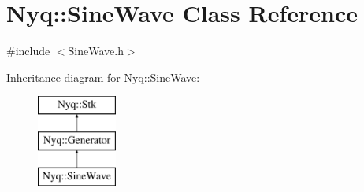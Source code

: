 \hypertarget{class_nyq_1_1_sine_wave}{}\section{Nyq\+:\+:Sine\+Wave Class Reference}
\label{class_nyq_1_1_sine_wave}


{\ttfamily \#include $<$Sine\+Wave.\+h$>$}

Inheritance diagram for Nyq\+:\+:Sine\+Wave\+:\begin{figure}[H]
\begin{center}
\leavevmode
\includegraphics[height=3.000000cm]{class_nyq_1_1_sine_wave}
\end{center}
\end{figure}
